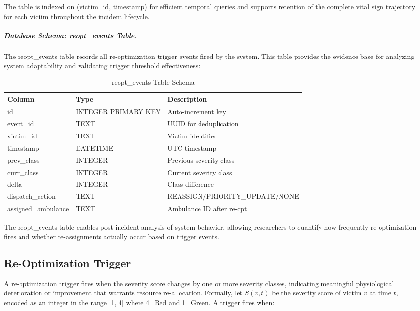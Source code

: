 \documentclass[conference]{IEEEtran}
\begin{document}
The table is indexed on (victim\_id, timestamp) for efficient temporal queries and supports retention of the complete vital sign trajectory for each victim throughout the incident lifecycle.

\subparagraph{Database Schema: reopt\_events Table.}
The reopt\_events table records all re-optimization trigger events fired by the system. This table provides the evidence base for analyzing system adaptability and validating trigger threshold effectiveness:

\begin{table}[t]
\caption{reopt\_events Table Schema}
\label{tab:reopt_schema}
\centering
\begin{tabularx}{\linewidth}{|l|X|X|}
\hline
\textbf{Column} & \textbf{Type} & \textbf{Description} \\
\hline
id & INTEGER PRIMARY KEY & Auto-increment key \\
event\_id & TEXT & UUID for deduplication \\
victim\_id & TEXT & Victim identifier \\
timestamp & DATETIME & UTC timestamp \\
prev\_class & INTEGER & Previous severity class \\
curr\_class & INTEGER & Current severity class \\
delta & INTEGER & Class difference \\
dispatch\_action & TEXT & REASSIGN/PRIORITY\_UPDATE/NONE \\
assigned\_ambulance & TEXT & Ambulance ID after re-opt \\
\hline
\end{tabularx}
\end{table}

The reopt\_events table enables post-incident analysis of system behavior, allowing researchers to quantify how frequently re-optimization fires and whether re-assignments actually occur based on trigger events.

\subsection{Re-Optimization Trigger}

A re-optimization trigger fires when the severity score changes by one or more severity classes, indicating meaningful physiological deterioration or improvement that warrants resource re-allocation. Formally, let $S(v,t)$ be the severity score of victim $v$ at time $t$, encoded as an integer in the range [1, 4] where 4=Red and 1=Green. A trigger fires when:
\end{document}
